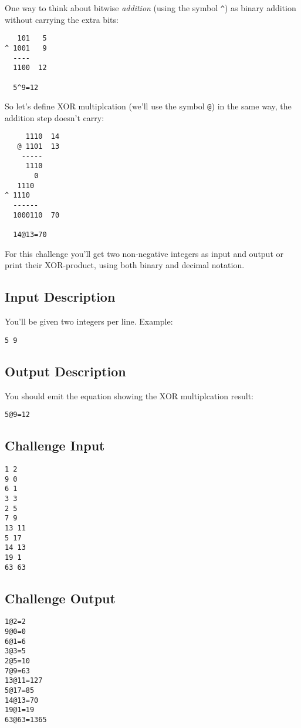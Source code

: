 One way to think about bitwise \emph{addition} (using the symbol
\texttt{\^{}}) as binary addition without carrying the extra bits:

\begin{verbatim}
   101   5
^ 1001   9
  ----  
  1100  12

  5^9=12
\end{verbatim}

So let's define XOR multiplcation (we'll use the symbol \texttt{@}) in
the same way, the addition step doesn't carry:

\begin{verbatim}
     1110  14
   @ 1101  13
    -----
     1110
       0
   1110
^ 1110 
  ------
  1000110  70

  14@13=70
\end{verbatim}

For this challenge you'll get two non-negative integers as input and
output or print their XOR-product, using both binary and decimal
notation.

\subsection{Input Description}\label{input-description-30}

You'll be given two integers per line. Example:

\begin{verbatim}
5 9
\end{verbatim}

\subsection{Output Description}\label{output-description-31}

You should emit the equation showing the XOR multiplcation result:

\begin{verbatim}
5@9=12
\end{verbatim}

\subsection{Challenge Input}\label{challenge-input-33}

\begin{verbatim}
1 2
9 0
6 1
3 3
2 5
7 9
13 11
5 17
14 13
19 1
63 63
\end{verbatim}

\subsection{Challenge Output}\label{challenge-output-27}

\begin{verbatim}
1@2=2
9@0=0
6@1=6
3@3=5
2@5=10
7@9=63
13@11=127
5@17=85
14@13=70
19@1=19
63@63=1365
\end{verbatim}
